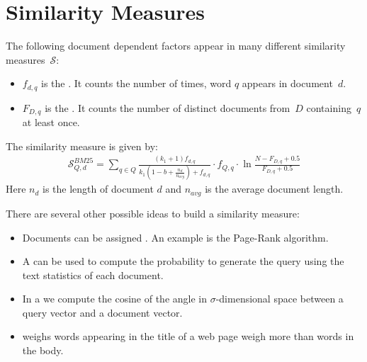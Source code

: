 \section{Similarity Measures}

\begin{Definition}
  The following document dependent factors appear in many different similarity measures~$\mathcal{S}$:
  \begin{itemize}
    \item $f_{d,q}$ is the . It counts the number of times, word $q$ appears in document~$d$.
    \item $F_{D,q}$ is the . It counts the number of distinct documents from~$D$ containing~$q$ at least once.
  \end{itemize}
\end{Definition}

\begin{Definition}
  The  similarity measure is given by:
  \begin{align}
    \mathcal{S}_{Q,d}^{BM25} = \sum\limits_{q \in Q}
    \frac{\left(k_1 + 1\right)f_{d,q}}{k_1\left(1 - b + \frac{n_d}{n_{avg}}\right) + f_{d,q}}
    \cdot f_{Q,q} \cdot
    \ln\frac{N - F_{D,q} + 0.5}{F_{D,q} + 0.5}
  \end{align}
  Here $n_d$ is the length of document $d$ and $n_{avg}$ is the average document length.
\end{Definition}

There are several other possible ideas to build a similarity measure:
\begin{itemize}
  \item Documents can be assigned . An example is the Page-Rank algorithm.
  \item A  can be used to compute the probability to generate the query using the text statistics of each document.
  \item In a  we compute the cosine of the angle in $\sigma$-dimensional space between a query vector and a document vector.
  \item {} weighs words appearing in the title of a web page weigh more than words in the body.
\end{itemize}
